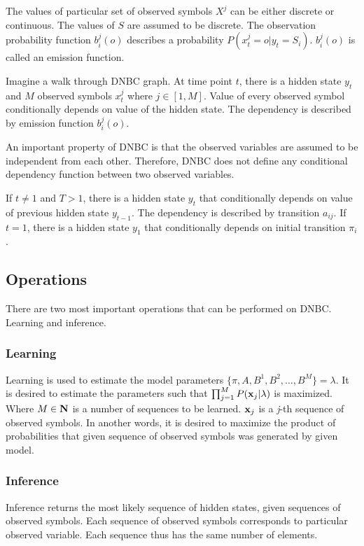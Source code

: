 \documentclass[thesis=B,english]{FITthesis}[2012/06/26]
\begin{document}
The values of particular set of observed symbols $X^j$ can be either discrete or continuous. The values of $S$ are assumed to be discrete. The observation probability function $b_i^j(o)$ describes a probability $P(x^j_t=o|y_t=S_i)$. $b_i^j(o)$ is called an emission function.

Imagine a walk through DNBC graph. At time point $t$, there is a hidden state $y_t$ and $M$ observed symbols $x^j_t$ where $j \in [1,M]$. Value of every observed symbol conditionally depends on value of the hidden state. The dependency is described by emission function $b_i^j(o)$.

An important property of DNBC is that the observed variables are assumed to be independent from each other. Therefore, DNBC does not define any conditional dependency function between two observed variables.

If $t \neq 1$ and $T > 1$, there is a hidden state $y_t$ that conditionally depends on value of previous hidden state $y_{t-1}$. The dependency is described by transition $a_{ij}$. If $t = 1$, there is a hidden state $y_1$ that conditionally depends on initial transition $\pi_i$.

\subsection{Operations}

There are two most important operations that can be performed on DNBC. Learning and inference.

\subsubsection{Learning}

Learning is used to estimate the model parameters $\{\pi,A,B^1,B^2,\dots,B^M\} = \lambda$. It is desired to estimate the parameters such that $\prod_{j=1}^{M} P(\textbf x_j | \lambda )$ is maximized. Where $M \in \textbf N$ is a number of sequences to be learned. $\textbf x_j$ is a \emph{j}-th sequence of observed symbols. In another words, it is desired to maximize the product of probabilities that given sequence of observed symbols was generated by given model.

\subsubsection{Inference}

Inference returns the most likely sequence of hidden states, given sequences of observed symbols. Each sequence of observed symbols corresponds to particular observed variable. Each sequence thus has the same number of elements.
\end{document}
